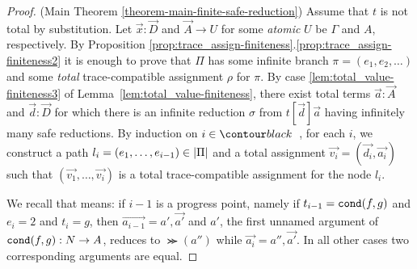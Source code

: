 %

\begin{proof}(Main Theorem \ref{theorem-main-finite-safe-reduction})
  Assume that $t$ is not total by substitution. 
  Let $\vec{x}:\vec{D}$ and $\vec{A}\rightarrow U$ for some \emph{atomic} $U$ 
 be $\Gamma$ and $A$, respectively.
  By Proposition \ref{prop:trace_assign-finiteness}.\ref{prop:trace_assign-finiteness2} it is enough to prove that
  $\Pi$ has some infinite branch $\pi=(e_1, e_2, \ldots)$ 
  and some \emph{total} trace-compatible assignment $\rho$ for $\pi$.
  By case \ref{lem:total_value-finiteness3} of Lemma~\ref{lem:total_value-finiteness},
  there exist total terms $\vec{a}:\vec{A}$ and $\vec{d}:\vec{D}$ for which there is
  an infinite reduction $\sigma$ from $t[\vec{d}]\vec{a}$ having infinitely many safe reductions.
  By induction on $i \in \Nat$, for each $i$, we construct a path 
  $l_i = (e_1,\ldots,e_{i-1}) \in {|\Pi|}$
  and a total assignment $\vec{v_i} = (\vec{d_i},\vec{a_i})$ such that
  $(\vec{v_1},\ldots,\vec{v_i})$ is a total trace-compatible assignment for the node $l_i$. 

  
 We recall that  means: 
 if $i-1$ is a progress point, namely if $t_{i-1}={\tt cond}(f,g)$ and $e_i=2$ 
    and $t_i=g$,
    then $\vec{a_{i-1}} = a',\vec{a'}$ 
    and $a'$, the first unnamed argument of ${\tt cond}(f,g):{N} \rightarrow A$, reduces to $\Succ(a'')$
     while $\vec{a_i} = a'',\vec{a'}$.
  In all other cases two corresponding arguments are equal.


\end{proof}
